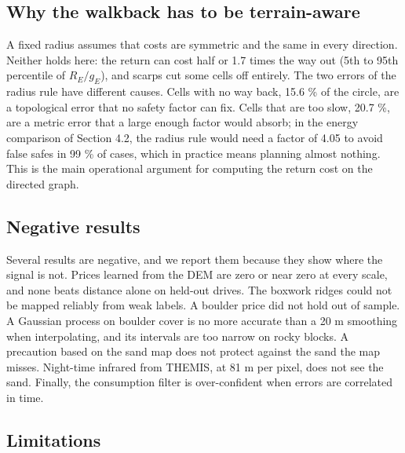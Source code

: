 \documentclass[11pt,a4paper]{article}
\begin{document}
\subsection{Why the walkback has to be terrain-aware}

A fixed radius assumes that costs are symmetric and the same in every direction. Neither holds here: the return can cost half or 1.7 times the way out (5th to 95th percentile of $R_E/g_E$), and scarps cut some cells off entirely. The two errors of the radius rule have different causes. Cells with no way back, 15.6 \% of the circle, are a topological error that no safety factor can fix. Cells that are too slow, 20.7 \%, are a metric error that a large enough factor would absorb; in the energy comparison of Section 4.2, the radius rule would need a factor of 4.05 to avoid false safes in 99 \% of cases, which in practice means planning almost nothing. This is the main operational argument for computing the return cost on the directed graph.

\subsection{Negative results}

Several results are negative, and we report them because they show where the signal is not. Prices learned from the DEM are zero or near zero at every scale, and none beats distance alone on held-out drives. The boxwork ridges could not be mapped reliably from weak labels. A boulder price did not hold out of sample. A Gaussian process on boulder cover is no more accurate than a 20 m smoothing when interpolating, and its intervals are too narrow on rocky blocks. A precaution based on the sand map does not protect against the sand the map misses. Night-time infrared from THEMIS, at 81 m per pixel, does not see the sand. Finally, the consumption filter is over-confident when errors are correlated in time.

\subsection{Limitations}
\end{document}
